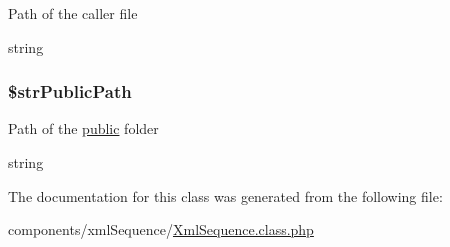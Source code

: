 Path of the caller file

string \hypertarget{class_xml_sequence_5fa653f11488edb1d638093f347807f5}{
\subsubsection[{\$strPublicPath}]{\setlength{\rightskip}{0pt plus 5cm}\$strPublicPath}}
\label{class_xml_sequence_5fa653f11488edb1d638093f347807f5}


Path of the \hyperlink{namespacepublic}{public} folder

string 

The documentation for this class was generated from the following file:\begin{CompactItemize}
\item 
components/xmlSequence/\hyperlink{_xml_sequence_8class_8php}{XmlSequence.class.php}\end{CompactItemize}
